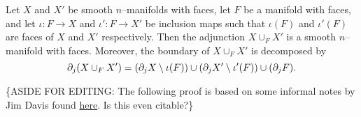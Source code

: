\begin{prop}
	Let $X$ and $X'$ be smooth $n$--manifolds with faces, let $F$ be a manifold with faces, and let $\iota:F\to X$ and $\iota':F\to X'$ be inclusion maps such that $\iota(F)$ and $\iota'(F)$ are faces of $X$ and $X'$ respectively.
	Then the adjunction $X\cup_F X'$ is a smooth $n$--manifold with faces.
	Moreover, the boundary of $X\cup_F X'$ is decomposed by $$\partial_j( X \cup_F X') = (\partial_j X\setminus \iota(F))\cup(\partial_j X'\setminus \iota'(F))\cup(\partial_j F).$$

\end{prop}

\{ASIDE FOR EDITING:  The following proof is based on some informal notes by Jim Davis found \href{http://www.indiana.edu/~jfdavis/notes/m623/smooth_structures_and_handles.pdf}{here}. Is this even citable?\}

